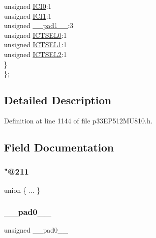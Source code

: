 \begin{DoxyCompactItemize}
\begin{tabbing}
\>\>unsigned \hyperlink{structtag_i_c12_c_o_n1_b_i_t_s_a6f1b5da2706b7c15fc8c9a01a30deaff}{ICI0}:1\\
\>\>unsigned \hyperlink{structtag_i_c12_c_o_n1_b_i_t_s_a7d5c777f0bc43f66f40462f79ed2179c}{ICI1}:1\\
\>\>unsigned \hyperlink{structtag_i_c12_c_o_n1_b_i_t_s_acaf2d0924a107ec6e8d2e31febaf66f9}{\_\_pad1\_\_}:3\\
\>\>unsigned \hyperlink{structtag_i_c12_c_o_n1_b_i_t_s_af6dd4d0e816b18462680d4b22fa926d3}{ICTSEL0}:1\\
\>\>unsigned \hyperlink{structtag_i_c12_c_o_n1_b_i_t_s_aa29140e739d886362537f87d199c4134}{ICTSEL1}:1\\
\>\>unsigned \hyperlink{structtag_i_c12_c_o_n1_b_i_t_s_a47d80892d449e6edbd5ba2ba9ff06deb}{ICTSEL2}:1\\
\>\} \\
\}; \\

\end{tabbing}\end{DoxyCompactItemize}


\subsection{Detailed Description}


Definition at line 1144 of file p33\+E\+P512\+M\+U810.\+h.



\subsection{Field Documentation}
\mbox{\label{structtag_i_c12_c_o_n1_b_i_t_s_a1b0556f48a539dee97ac959b86a825e8}} 
\subsubsection{\texorpdfstring{"@211}{@211}}
{\footnotesize\ttfamily union \{ ... \} }

\mbox{\label{structtag_i_c12_c_o_n1_b_i_t_s_adf71f3d8410c1f1dbbc96680a92c49af}} 
\subsubsection{\texorpdfstring{\+\_\+\+\_\+pad0\+\_\+\+\_\+}{\_\_pad0\_\_}}
{\footnotesize\ttfamily unsigned \+\_\+\+\_\+pad0\+\_\+\+\_\+}



